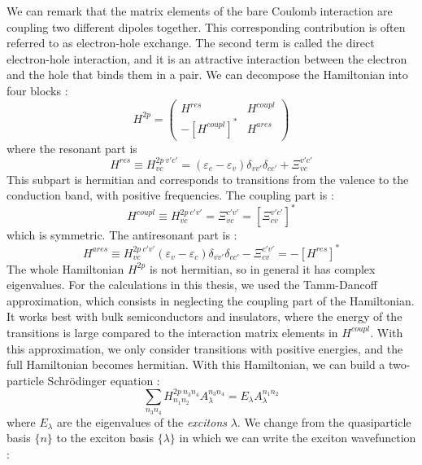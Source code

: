 We can remark that the matrix elements of the bare Coulomb interaction are coupling two different dipoles together. This corresponding contribution is often referred to as electron-hole exchange. The second term is called the direct electron-hole interaction, and it is an attractive interaction between the electron and the hole that binds them in a pair.
We can decompose the Hamiltonian into four blocks :
\begin{equation}
	H^{2p} = \begin{pmatrix}
		H^{res} & H^{coupl} \\
		-[H^{coupl}]^* & H^{ares}
	\end{pmatrix}
\end{equation}
where the resonant part is 
\begin{equation}
	H^{res} \equiv H^{2p\ v'c'}_{vc} = (\varepsilon_c - \varepsilon_v) \delta_{vv'}\delta_{cc'} + \Xi^{v'c'}_{vc}
\end{equation}
This subpart is hermitian and corresponds to transitions from the valence to the conduction band, with positive frequencies. The coupling part is :
\begin{equation}
	H^{coupl} \equiv H^{2p\ c'v'}_{vc} = \Xi^{c'v'}_{vc} = [\Xi^{v'c'}_{cv}]^*
\end{equation}
which is symmetric. The antiresonant part is :
\begin{equation}
	H^{ares} \equiv H^{2p\ c'v'}_{vc} (\varepsilon_v - \varepsilon_c)\delta_{vv'}\delta_{cc'} - \Xi^{c'v'}_{cv} = - [H^{res}]^*
\end{equation}
The whole Hamiltonian $H^{2p}$ is not hermitian, so in general it has complex eigenvalues. For the calculations in this thesis, we used the Tamm-Dancoff approximation, which consists in neglecting the coupling part of the Hamiltonian. It works best with bulk semiconductors and insulators, where the energy of the transitions is large compared to the interaction matrix elements in $H^{coupl}$. With this approximation, we only consider transitions with positive energies, and the full Hamiltonian becomes hermitian.
With this Hamiltonian, we can build a two-particle Schrödinger equation :
\begin{equation}
	\sum_{n_3n_4} H^{2p\ n_3n_4}_{n_1n_2} A_\lambda^{n_3n_4} = E_\lambda A_\lambda^{n_1n_2}
\end{equation}
where $E_\lambda$ are the eigenvalues of the \textit{excitons} $\lambda$. We change from the quasiparticle basis $\{n\}$ to the exciton basis $\{\lambda\}$ in which we can write the exciton wavefunction :
